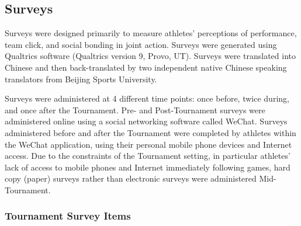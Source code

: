 \begin{CJK}{UTF8}{gbsn}


\subsection{Surveys}
Surveys were designed primarily to measure athletes' perceptions of performance, team click, and social bonding in joint action.  Surveys were generated using Qualtrics software (Qualtrics version 9, Provo, UT). Surveys were translated into Chinese and then back-translated by two independent native Chinese speaking translators from Beijing Sports University.

Surveys were administered at 4 different time points: once before, twice during, and once after the Tournament.  Pre- and Post-Tournament surveys were administered online using a social networking software called WeChat. Surveys administered before and after the Tournament were completed by athletes within the WeChat application, using their personal mobile phone devices and Internet access.  Due to the constraints of the Tournament setting, in particular athletes' lack of access to mobile phones and Internet immediately following games, hard copy (paper) surveys rather than electronic surveys were administered Mid-Tournament.





\subsubsection{Tournament Survey Items\label{survey:Tournament Survey Items}}


\end{CJK}
